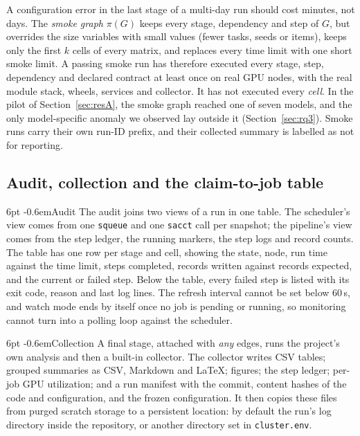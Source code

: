 \documentclass[pdflatex,sn-mathphys-num]{sn-jnl}
\makeatletter
\theoremstyle{thmstyletwo}%
\theoremstyle{thmstylethree}%
\newcommand{\code}[1]{\texttt{#1}}
\renewcommand\paragraph{\@startsection{paragraph}{4}{\z@}%
  {6pt \@plus 2pt \@minus 1pt}{-0.6em}{\normalfont\normalsize\bfseries}}
\makeatother
\begin{document}
A configuration error in the last stage of a multi-day run should cost minutes, not days. The \emph{smoke graph} $\pi(G)$ keeps every stage, dependency and step of $G$, but overrides the size variables with small values (fewer tasks, seeds or items), keeps only the first $k$ cells of every matrix, and replaces every time limit with one short smoke limit. A passing smoke run has therefore executed every stage, step, dependency and declared contract at least once on real GPU nodes, with the real module stack, wheels, services and collector. It has not executed every \emph{cell}. In the pilot of Section~\ref{sec:resA}, the smoke graph reached one of seven models, and the only model-specific anomaly we observed lay outside it (Section~\ref{sec:rq3}). Smoke runs carry their own run-ID prefix, and their collected summary is labelled as not for reporting.

\subsection{Audit, collection and the claim-to-job table}\label{sec:coverage}

\paragraph{Audit} The audit joins two views of a run in one table. The scheduler's view comes from one \code{squeue} and one \code{sacct} call per snapshot; the pipeline's view comes from the step ledger, the running markers, the step logs and record counts. The table has one row per stage and cell, showing the state, node, run time against the time limit, steps completed, records written against records expected, and the current or failed step. Below the table, every failed step is listed with its exit code, reason and last log lines. The refresh interval cannot be set below 60\,s, and watch mode ends by itself once no job is pending or running, so monitoring cannot turn into a polling loop against the scheduler.

\paragraph{Collection} A final stage, attached with \emph{any} edges, runs the project's own analysis and then a built-in collector. The collector writes CSV tables; grouped summaries as CSV, Markdown and \LaTeX{}; figures; the step ledger; per-job GPU utilization; and a run manifest with the commit, content hashes of the code and configuration, and the frozen configuration. It then copies these files from purged scratch storage to a persistent location: by default the run's log directory inside the repository, or another directory set in \code{cluster.env}.
\end{document}

